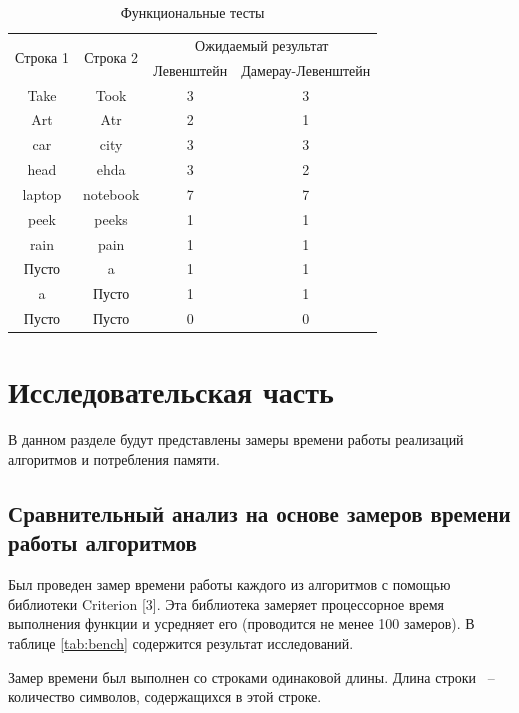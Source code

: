 \documentclass[14pt,russian]{scrartcl}
\begin{document}
\begin{table}[htb]
	\caption{\centering Функциональные тесты}
	\centering
	\begin{tabular}{|c|c|c|c|}
		\hline
		\multirow{2}{*}{Строка 1} & \multirow{2}{*}{Строка 2} & \multicolumn{2}{c|}{Ожидаемый результат} \\ \cline{3-4} 
		&          & Левенштейн & Дамерау-Левенштейн \\ \hline
		Take   & Took     & 3          & 3                   \\ \hline
		Art    & Atr      & 2          & 1                   \\ \hline
		car    & city     & 3          & 3                   \\ \hline
		head   & ehda     & 3          & 2                   \\ \hline
		laptop & notebook & 7          & 7                   \\ \hline
		peek   & peeks    & 1          & 1                   \\ \hline
		rain   & pain     & 1          & 1                   \\ \hline
		Пусто   & a     &   1          & 1                   \\ \hline
		a   & Пусто     &   1          & 1                   \\ \hline
		Пусто   & Пусто     &   0          & 0                   \\ \hline
	\end{tabular}
	\label{tab:func_tests}
\end{table}
	
	\section{Исследовательская часть}
	В данном разделе будут представлены замеры времени работы реализаций алгоритмов и потребления памяти.
	
	\subsection{Сравнительный анализ на основе замеров времени работы алгоритмов}
	
	Был проведен замер времени работы каждого из алгоритмов с помощью библиотеки Criterion [3]. Эта библиотека замеряет процессорное время выполнения функции и усредняет его (проводится не менее 100 замеров). В таблице \ref{tab:bench} содержится результат исследований.

	Замер времени был выполнен со строками одинаковой длины. Длина строки ~--~ количество символов, содержащихся в этой строке.\
\end{document}
